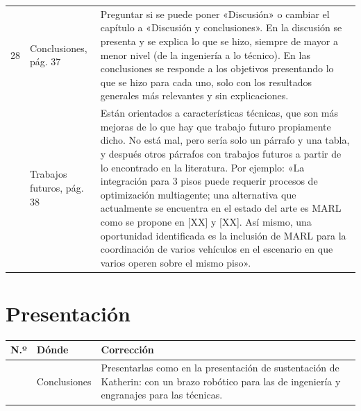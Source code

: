 \documentclass[11pt]{article}
\begin{document}
{\begin{longtable}{@{}L{0.04\textwidth}L{0.24\textwidth}L{0.66\textwidth}@{}}
28 & Conclusiones, pág. 37 & Preguntar si se puede poner «Discusión» o cambiar el capítulo a «Discusión y conclusiones». En la discusión se presenta y se explica lo que se hizo, siempre de mayor a menor nivel (de la ingeniería a lo técnico). En las conclusiones se responde a los objetivos presentando lo que se hizo para cada uno, solo con los resultados generales más relevantes y sin explicaciones. \\  & Trabajos futuros, pág. 38 & Están orientados a características técnicas, que son más mejoras de lo que hay que trabajo futuro propiamente dicho. No está mal, pero sería solo un párrafo y una tabla, y después otros párrafos con trabajos futuros a partir de lo encontrado en la literatura. Por ejemplo: «La integración para 3 pisos puede requerir procesos de optimización multiagente; una alternativa que actualmente se encuentra en el estado del arte es MARL como se propone en [XX] y [XX]. Así mismo, una oportunidad identificada es la inclusión de MARL para la coordinación de varios vehículos en el escenario en que varios operen sobre el mismo piso». \\
\end{longtable}}

\section*{Presentación}

{\small
\begin{longtable}{@{}L{0.04\textwidth}L{0.24\textwidth}L{0.66\textwidth}@{}}
\toprule
\textbf{N.º} & \textbf{Dónde} & \textbf{Corrección} \\ \midrule
\endfirsthead
\bottomrule
{} & Conclusiones & Presentarlas como en la presentación de sustentación de Katherin: con un brazo robótico para las de ingeniería y engranajes para las técnicas. \\
\end{longtable}}
\end{document}
